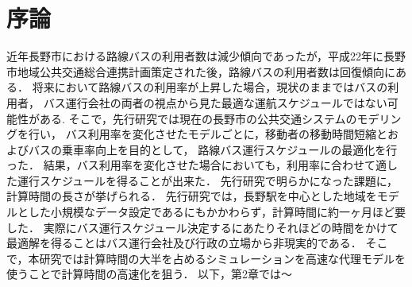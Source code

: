\documentclass[main]{subfiles}
\begin{document}
\chapter{序論}
近年長野市における路線バスの利用者数は減少傾向であったが，平成22年に長野市地域公共交通総合連携計画策定された後，路線バスの利用者数は回復傾向にある．\cite{naganokeikaku}
将来において路線バスの利用率が上昇した場合，現状のままではバスの利用者，
バス運行会社の両者の視点から見た最適な運航スケジュールではない可能性がある.
そこで，先行研究では現在の長野市の公共交通システムのモデリングを行い，
バス利用率を変化させたモデルごとに，移動者の移動時間短縮とおよびバスの乗車率向上を目的として，
路線バス運行スケジュールの最適化を行った．\cite{senkoukenkyu}
結果，バス利用率を変化させた場合においても，利用率に合わせて適した運行スケジュールを得ることが出来た．
先行研究で明らかになった課題に，計算時間の長さが挙げられる．
先行研究では，長野駅を中心とした地域をモデルとした小規模なデータ設定であるにもかかわらず，計算時間に約一ヶ月ほど要した．
実際にバス運行スケジュール決定するにあたりそれほどの時間をかけて最適解を得ることはバス運行会社及び行政の立場から非現実的である．
そこで，本研究では計算時間の大半を占めるシミュレーションを高速な代理モデルを使うことで計算時間の高速化を狙う．
以下，第2章では～
\end{document}
